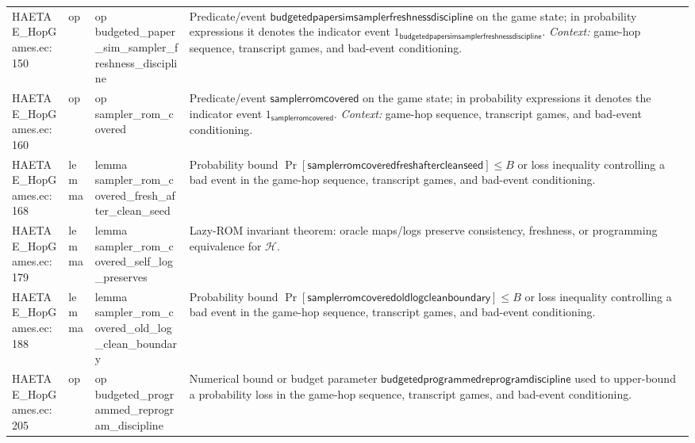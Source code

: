 \documentclass[10pt]{article}
\begin{document}
\begin{longtable}{L{0.11\textwidth}L{0.055\textwidth}L{0.385\textwidth}L{0.41\textwidth}}
HAETAE\_\allowbreak{}HopGames.\allowbreak{}ec:\allowbreak{}150 & op & {\ttfamily\scriptsize op budgeted\_\allowbreak{}paper\_\allowbreak{}sim\_\allowbreak{}sampler\_\allowbreak{}freshness\_\allowbreak{}discipline} & Predicate/event $\mathsf{budgetedpapersimsamplerfreshnessdiscipline}$ on the game state; in probability expressions it denotes the indicator event $1_{\mathsf{budgetedpapersimsamplerfreshnessdiscipline}}$. \emph{Context:} game-hop sequence, transcript games, and bad-event conditioning. \\
HAETAE\_\allowbreak{}HopGames.\allowbreak{}ec:\allowbreak{}160 & op & {\ttfamily\scriptsize op sampler\_\allowbreak{}rom\_\allowbreak{}covered} & Predicate/event $\mathsf{samplerromcovered}$ on the game state; in probability expressions it denotes the indicator event $1_{\mathsf{samplerromcovered}}$. \emph{Context:} game-hop sequence, transcript games, and bad-event conditioning. \\
HAETAE\_\allowbreak{}HopGames.\allowbreak{}ec:\allowbreak{}168 & lemma & {\ttfamily\scriptsize lemma sampler\_\allowbreak{}rom\_\allowbreak{}covered\_\allowbreak{}fresh\_\allowbreak{}after\_\allowbreak{}clean\_\allowbreak{}seed} & Probability bound $\Pr[\mathsf{samplerromcoveredfreshaftercleanseed}]\le B$ or loss inequality controlling a bad event in the game-hop sequence, transcript games, and bad-event conditioning. \\
HAETAE\_\allowbreak{}HopGames.\allowbreak{}ec:\allowbreak{}179 & lemma & {\ttfamily\scriptsize lemma sampler\_\allowbreak{}rom\_\allowbreak{}covered\_\allowbreak{}self\_\allowbreak{}log\_\allowbreak{}preserves} & Lazy-ROM invariant theorem: oracle maps/logs preserve consistency, freshness, or programming equivalence for $\mathcal H$. \\
HAETAE\_\allowbreak{}HopGames.\allowbreak{}ec:\allowbreak{}188 & lemma & {\ttfamily\scriptsize lemma sampler\_\allowbreak{}rom\_\allowbreak{}covered\_\allowbreak{}old\_\allowbreak{}log\_\allowbreak{}clean\_\allowbreak{}boundary} & Probability bound $\Pr[\mathsf{samplerromcoveredoldlogcleanboundary}]\le B$ or loss inequality controlling a bad event in the game-hop sequence, transcript games, and bad-event conditioning. \\
HAETAE\_\allowbreak{}HopGames.\allowbreak{}ec:\allowbreak{}205 & op & {\ttfamily\scriptsize op budgeted\_\allowbreak{}programmed\_\allowbreak{}reprogram\_\allowbreak{}discipline} & Numerical bound or budget parameter $\mathsf{budgetedprogrammedreprogramdiscipline}$ used to upper-bound a probability loss in the game-hop sequence, transcript games, and bad-event conditioning. \\

\end{longtable}
\end{document}
